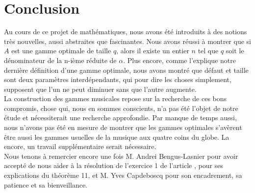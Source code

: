 \documentclass[moyen]{classeUPD}
\begin{document}
\clearpage
\chapter*{Conclusion}

Au cours de ce projet de mathématiques, nous avons été introduits à des notions très nouvelles, aussi abstraites que fascinantes. Nous avons réussi à montrer que si $A$ est une gamme optimale de taille $q$, alors il existe un entier $n$ tel que $q$ soit le dénominateur de la n-ième réduite de $\alpha$. Plus encore, comme l'explique notre dernière définition d'une gamme optimale, nous avons montré que défaut et taille sont deux paramètres interdépendants, qui pour dire les choses simplement, supposent que l'un ne peut diminuer sans que l'autre augmente.\\ La construction des gammes musicales repose sur la recherche de ces bons compromis, chose qui, nous en sommes conscients, n'a pas été l'objet de notre étude et nécessiterait une recherche approfondie. Par manque de temps aussi, nous n'avons pas été en mesure de montrer que les gammes optimales s'avèrent être aussi les gammes usuelles de la musique aux quatre coins du globe. La encore, un travail supplémentaire serait nécessaire.\\ Nous tenons à remercier encore une fois M. Andrei Bengus-Lasnier pour avoir accepté de nous aider à la résolution de l'exercice 1 de l'article \cite{caruso_application_nodate}, pour ses explications du théorème 11, et M. Yves Capdeboscq pour son encadrement, sa patience et sa bienveillance.

\clearpage
\listoffigures
\printbibliography
\end{document}
